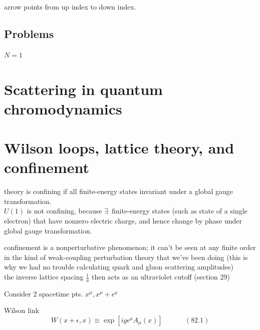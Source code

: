 \documentclass[twoside]{amsart}
\newcommand{\problemhead}[1]
  {\smallskip
   \noindent{\large\bf Problem #1.}
   }
\begin{document}
arrow points from up index to down index.  








\subsection*{ Problems }

\problemhead{1} $N=1$ 





\section{ Scattering in quantum chromodynamics}

\section{ Wilson loops, lattice theory, and confinement}


theory is confining if all finite-energy states invariant under a global gauge transformation. \\
$U(1)$ is not confining, because $\exists \, $ finite-energy states (such as state of a single electron) that have nonzero electric charge, and hence change by phase under global gauge transformation.  

confinement is a nonperturbative phenomenon; it can't be seen at any finite order in the kind of weak-coupling perturbation theory that we've been doing (this is why we had no trouble calculating quark and gluon scattering amplitudes) \\
the inverse lattice spacing $\frac{1}{a}$ then acts as an ultraviolet cutoff (section 29) 

Consider 2 spacetime pts. $x^{\mu}, x^{\mu} + \epsilon^{\mu}$ 

Wilson link 
\begin{equation}
  W(x+\epsilon, x) \equiv \exp{  [ ig \epsilon^{\mu} A_{\mu}(x) ] } \quad \quad \quad \, (82.1)
\end{equation}
\end{document}
